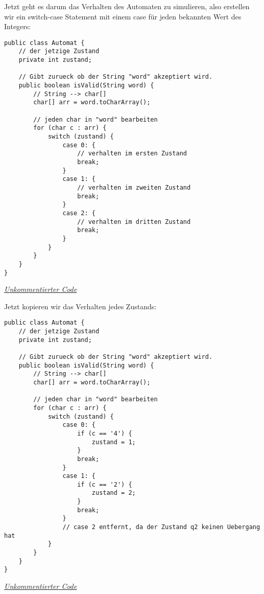 \begin{flushleft}
    Jetzt geht es darum das Verhalten des Automaten zu simulieren, also erstellen wir ein switch-case Statement mit einem case für
    jeden bekannten Wert des Integers:
\end{flushleft}

\begin{center}
\begin{lstlisting}
public class Automat {
    // der jetzige Zustand
    private int zustand;

    // Gibt zurueck ob der String "word" akzeptiert wird.
    public boolean isValid(String word) {
        // String --> char[]
        char[] arr = word.toCharArray();

        // jeden char in "word" bearbeiten
        for (char c : arr) {
            switch (zustand) {
                case 0: {
                    // verhalten im ersten Zustand
                    break;
                }
                case 1: {
                    // verhalten im zweiten Zustand
                    break;
                }
                case 2: {
                    // verhalten im dritten Zustand
                    break;
                }
            }
        }
    }
}
\end{lstlisting}
\href{https://raw.githubusercontent.com/tim-tm/informatik-notes/main/code/Automat.java}{\textit{Unkommentierter Code}} \\
\end{center}

\begin{flushleft}
    Jetzt kopieren wir das Verhalten jedes Zustands:
\end{flushleft}

\begin{center}
\begin{lstlisting}
public class Automat {
    // der jetzige Zustand
    private int zustand;

    // Gibt zurueck ob der String "word" akzeptiert wird.
    public boolean isValid(String word) {
        // String --> char[]
        char[] arr = word.toCharArray();

        // jeden char in "word" bearbeiten
        for (char c : arr) {
            switch (zustand) {
                case 0: {
                    if (c == '4') {
                        zustand = 1;
                    }
                    break;
                }
                case 1: {
                    if (c == '2') {
                        zustand = 2;
                    }
                    break;
                }
                // case 2 entfernt, da der Zustand q2 keinen Uebergang hat
            }
        }
    }
}
\end{lstlisting}
\href{https://raw.githubusercontent.com/tim-tm/informatik-notes/main/code/Automat.java}{\textit{Unkommentierter Code}} \\
\end{center}

